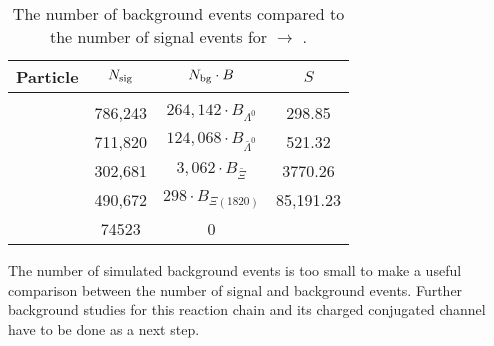 \begin{table}
	\centering
	\caption{\propose The number of background events compared to the number of signal events for \pbarpSystem $\rightarrow$ \excitedcascade \anticascade.}
	\label{bg_compared_reco_with_scaling}
	\begin{tabular}{lccc}
		\hline
		Particle & $N_{\textnormal{sig}}$ & $N_{\textnormal{bg}} \cdot B$ & $S$\\
		\hline
		\hline
		& & &\\
		\lam & 786,243 &$ 264,142 \cdot B_{\Lambda^0}$& 298.85\\
		\alam & 711,820 & $124,068 \cdot B_{\bar{\Lambda}^0}$ & 521.32\\
		\anticascade & 302,681 & $3,062 \cdot B_{\bar{\Xi}}$ & 3770.26\\
		\excitedcascade &490,672  & $298 \cdot B_{\Xi\left(1820\right)}$& 85,191.23\\
		\excitedcascade \anticascade &  74523 & 0 & \\
		\hline
		 
		  
	\end{tabular}
\end{table}
The number of simulated background events is too small to make a useful comparison between the number of signal and background events.
Further background studies for this reaction chain and its charged conjugated channel have to be done as a next step.
	